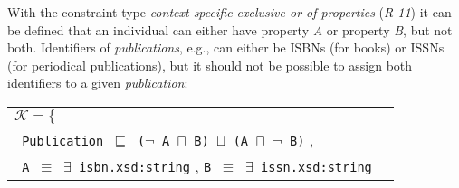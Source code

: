 \documentclass{acm_proc_article-sp}
\newcommand{\ms}[1]{%
  \texttt{#1}
}
\newenvironment{DL}{
  \vspace{0cm}
  \begin{tabular}{l l}

}{
  \end{tabular}
}
\begin{document}
%
%
%
With the constraint type {\em context-specific exclusive or of properties} (\emph{R-11}) 
it can be defined that an individual can either have property \emph{A} or property \emph{B}, but not both.
Identifiers of \emph{publications}, e.g., can either be ISBNs (for books) or ISSNs (for periodical publications), but it should not be possible to assign both identifiers to a given \emph{publication}:
{\scriptsize
\begin{center}
\begin{DL} 
$\mathcal{K}=\{$ \\ 
 \ms{ Publication $\sqsubseteq$ ($\neg$ A $\sqcap$ B) $\sqcup$ (A $\sqcap$ $\neg$ B)}, \\
 \ms{ A $\equiv	$ $\exists$ isbn.xsd:string}, \ms{B $\equiv$ $\exists$ issn.xsd:string}\\
\end{DL}
\end{center}
}%
\end{document}
